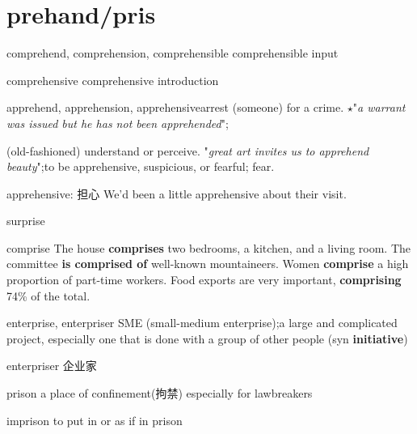 \chapter{prehand/pris}

\begin{word}{comprehend, comprehension, comprehensible}
    comprehensible input
\end{word}

\begin{word}{comprehensive}
    comprehensive introduction
\end{word}

\begin{word}{apprehend, apprehension, apprehensive}arrest (someone) for a crime.
    $\star$"\textit{a warrant was issued but he has not been apprehended}";
    
    (old-fashioned) understand or perceive.
    "\textit{great art invites us to apprehend beauty}";to be apprehensive, suspicious, or fearful; fear.

    apprehensive: 担心 We'd been a little {apprehensive} about their visit.
\end{word}

\begin{word}{surprise}
\end{word}

\begin{word}{comprise}
    The house \textbf{comprises} two bedrooms, a kitchen, and a living room. The committee \textbf{is comprised of} well-known mountaineers. Women \textbf{comprise} a high proportion of part-time workers. Food exports are very important, \textbf{comprising} 74\% of the total.
\end{word}

\begin{word}{enterprise, enterpriser}
    SME (small-medium enterprise);a large and complicated project, especially one that is done with a group of other people (syn \textbf{initiative})

    enterpriser 企业家
\end{word}

\begin{word}{prison}
    a place of confinement(拘禁) especially for lawbreakers
\end{word}

\begin{word}{imprison}
    to put in or as if in prison
\end{word}